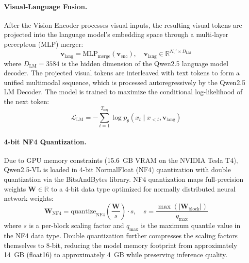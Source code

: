 \paragraph{Visual-Language Fusion.}
After the Vision Encoder processes visual inputs, the resulting visual tokens are projected into the language model's embedding space through a multi-layer perceptron (MLP) merger:
\begin{equation}
    \mathbf{v}_{\text{lang}} = \text{MLP}_{\text{merge}}(\mathbf{v}_{\text{enc}}), \quad \mathbf{v}_{\text{lang}} \in \mathbb{R}^{N_v' \times D_{\text{LM}}}
    \label{eq:qwen_merge}
\end{equation}
where $D_{\text{LM}} = 3584$ is the hidden dimension of the Qwen2.5 language model decoder. The projected visual tokens are interleaved with text tokens to form a unified multimodal sequence, which is processed autoregressively by the Qwen2.5 LM Decoder. The model is trained to maximize the conditional log-likelihood of the next token:
\begin{equation}
    \mathcal{L}_{\text{LM}} = -\sum_{t=1}^{T_{\text{seq}}} \log p_\theta(x_t \mid x_{<t}, \mathbf{v}_{\text{lang}})
    \label{eq:qwen_lm_obj}
\end{equation}

\paragraph{4-bit NF4 Quantization.}
Due to GPU memory constraints (15.6~GB VRAM on the NVIDIA Tesla T4), Qwen2.5-VL is loaded in 4-bit NormalFloat (NF4) quantization with double quantization via the BitsAndBytes library. NF4 quantization maps full-precision weights $\mathbf{W} \in \mathbb{R}$ to a 4-bit data type optimized for normally distributed neural network weights:
\begin{equation}
    \mathbf{W}_{\text{NF4}} = \text{quantize}_{\text{NF4}}\!\left(\frac{\mathbf{W}}{s}\right) \cdot s, \quad s = \frac{\max(|\mathbf{W}_{\text{block}}|)}{q_{\max}}
    \label{eq:qwen_nf4}
\end{equation}
where $s$ is a per-block scaling factor and $q_{\max}$ is the maximum quantile value in the NF4 data type. Double quantization further compresses the scaling factors themselves to 8-bit, reducing the model memory footprint from approximately 14~GB (float16) to approximately 4~GB while preserving inference quality.

